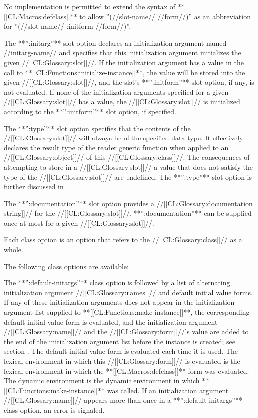 No implementation is permitted to extend the syntax of **[[CL:Macros:defclass]]** to allow ''(//slot-name// //form//)'' as an abbreviation for ''(//slot-name// :initform //form//)''. 

\itemitem{\bull} The **'':initarg''** slot option declares an initialization argument named //initarg-name// and specifies that this initialization argument initializes the given //[[CL:Glossary:slot]]//. If the initialization argument has a value in the call to **[[CL:Functions:initialize-instance]]**, the value will be stored into the given //[[CL:Glossary:slot]]//, and the slot's **'':initform''** slot option, if any, is not evaluated. If none of the initialization arguments specified for a given //[[CL:Glossary:slot]]// has a value, the //[[CL:Glossary:slot]]// is initialized according to the **'':initform''** slot option, if specified.

\itemitem{\bull} The **'':type''** slot option specifies that the contents of the //[[CL:Glossary:slot]]// will always be of the specified data type. It effectively declares the result type of the reader generic function when applied to an //[[CL:Glossary:object]]// of this //[[CL:Glossary:class]]//. The consequences of attempting to store in a //[[CL:Glossary:slot]]// a value that does not satisfy the type of the //[[CL:Glossary:slot]]// are undefined. The **'':type''** slot option is further discussed in \secref\SlotInheritance.

\itemitem{\bull} The **'':documentation''** slot option provides a //[[CL:Glossary:documentation string]]// for the //[[CL:Glossary:slot]]//. **'':documentation''** can be supplied once at most for a given //[[CL:Glossary:slot]]//.  \endlist

Each class option is an option that refers to the //[[CL:Glossary:class]]// as a whole.

The following class options are available:

\beginlist \itemitem{\bull} The **'':default-initargs''** class option is followed by a list of alternating initialization argument //[[CL:Glossary:names]]// and default initial value forms. If any of these initialization arguments does not appear in the initialization argument list supplied to **[[CL:Functions:make-instance]]**, the corresponding default initial value form is evaluated, and the initialization argument //[[CL:Glossary:name]]// and the //[[CL:Glossary:form]]//'s value are added to the end of the initialization argument list before the instance is created; see section {\secref\ObjectCreationAndInit}. The default initial value form is evaluated each time it is used. The lexical environment in which this //[[CL:Glossary:form]]// is evaluated is the lexical environment in which the **[[CL:Macros:defclass]]** form was evaluated. The dynamic environment is the dynamic environment in which **[[CL:Functions:make-instance]]** was called. If an initialization argument //[[CL:Glossary:name]]// appears more than once in a **'':default-initargs''** class option, an error is signaled.


